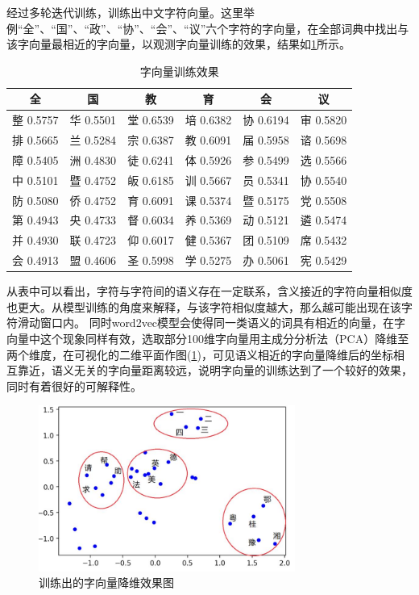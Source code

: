 \documentclass[winfonts,master,oneside,nobackinfo]{njuthesis}
\begin{document}
经过多轮迭代训练，训练出中文字符向量。这里举例“全”、“国”、“政”、“协”、“会”、“议”六个字符的字向量，在全部词典中找出与该字向量最相近的字向量，以观测字向量训练的效果，结果如\ref{char_embedding}所示。

\begin{table}[h]
\centering
\begin{tabular}{cccccc} %
\hline 
全& 国& 教& 育& 会& 议\\
\hline  
整 0.5757& 华 0.5501& 堂 0.6539& 培 0.6382&协 0.6194&审 0.5820\\
排 0.5665& 兰 0.5284& 宗 0.6387& 教 0.6091&届 0.5958&谘 0.5698\\
障 0.5405& 洲 0.4830& 徒 0.6241& 体 0.5926&参 0.5499&选 0.5566\\
中 0.5101& 暨 0.4752& 皈 0.6185& 训 0.5667&员 0.5341&协 0.5540\\
防 0.5080& 侨 0.4752& 育 0.6091& 课 0.5374&暨 0.5175&党 0.5508\\
第 0.4943& 央 0.4733& 督 0.6034& 养 0.5369&动 0.5121&遴 0.5474\\
并 0.4930& 联 0.4723& 仰 0.6017& 健 0.5367&团 0.5109&席 0.5432\\
会 0.4913& 盟 0.4606& 圣 0.5998& 学 0.5275&办 0.5061&宪 0.5429\\
\hline 
\end{tabular}
\caption{字向量训练效果}
\label{char_embedding}
\end{table}

从表中可以看出，字符与字符间的语义存在一定联系，含义接近的字符向量相似度也更大。从模型训练的角度来解释，与该字符相似度越大，那么越可能出现在该字符滑动窗口内。
同时word2vec模型会使得同一类语义的词具有相近的向量，在字向量中这个现象同样有效，选取部分100维字向量用主成分分析法（PCA）降维至两个维度，在可视化的二维平面作图(\ref{charVecPCA})，可见语义相近的字向量降维后的坐标相互靠近，语义无关的字向量距离较远，说明字向量的训练达到了一个较好的效果，同时有着很好的可解释性。

\begin{figure}[h]
\centering
\includegraphics[width=0.75\textwidth]{./figure/字向量降维.jpg}
\caption{训练出的字向量降维效果图}
\label{charVecPCA}
\end{figure}
\end{document}

